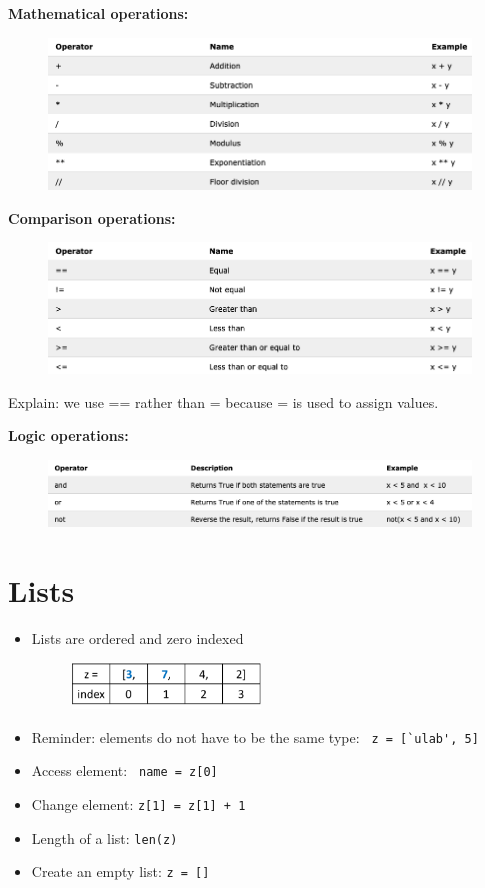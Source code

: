 \documentclass[12pt]{article}
\numberwithin{equation}{section}
\begin{document}
\textbf{Mathematical operations:}
\begin{figure}[H]
	\centering
	\includegraphics[width=15cm] {math}
\end{figure}

\textbf{Comparison operations: }
\begin{figure}[H]
	\centering
	\includegraphics[width=15cm] {comp}
\end{figure}
Explain: we use == rather than = because = is used to assign values.

\textbf{Logic operations: }
\begin{figure}[H]
	\centering
	\includegraphics[width=15cm] {logic}
\end{figure}

\section{Lists}
\begin{itemize}
    \item Lists are ordered and zero indexed
    \begin{figure}[H]
	    \centering
	    \includegraphics[width=5cm] {index}
    \end{figure}
    \item Reminder: elements do not have to be the same type: \verb| z = [`ulab', 5]|
    \item Access element: \verb| name = z[0]|
    \item Change element: \verb|z[1] = z[1] + 1|
    \item Length of a list: \verb|len(z)|
    \item Create an empty list: \verb|z = []|
\end{itemize}
\end{document}
